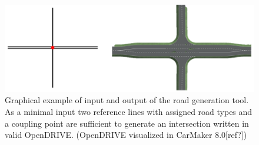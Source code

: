 \documentclass[a4paper, 10pt, conference]{ieeeconf}      %
\begin{document}


\begin{figure}[tpb] 		
	\centering
	\includegraphics{fig/motivation.png}
	\caption{Graphical example of input and output of the road generation tool. As a minimal input two reference lines with assigned road types and a coupling point are sufficient to generate an intersection written in valid OpenDRIVE. (OpenDRIVE visualized in CarMaker 8.0[ref?])}
	\label{fig_motivation}
\end{figure}
\end{document}
